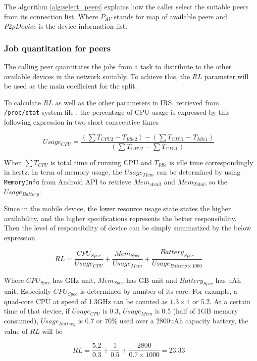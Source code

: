 \documentclass[conference]{IEEEtran}
\begin{document}
The algorithm \ref{alg:select_peers} explains how the caller select the suitable peers from its connection list. Where $P_{AV}$ stands for map of available peers and $P2pDevice$ is the device information list.\\

\subsubsection{Job quantitation for peers}\label{ss_jqfp}

The calling peer quantitates the jobs from a task to distribute to the other available devices in the network suitably. To achieve this, the $RL$ parameter will be used as the main coefficient for the split. 
 
To calculate $RL$ as well as the other parameters in IRS, retrieved from \texttt{/proc/stat} system file \cite{stat_explain}, the percentage of CPU usage is expressed by this following expression in two short consecutive times

$$Usage_{CPU} = \frac{(\sum{T_{CPU2}} - T_{Idle2}) - (\sum{T_{CPU1}} - T_{Idle1})}{(\sum{T_{CPU2}} - \sum{T_{CPU1}})}$$

When $\sum{T_{CPU}}$ is total time of running CPU and $T_{Idle}$ is idle time correspondingly in hertz. In term of memory usage, the $Usage_{Mem}$ can be determined by using \texttt{MemoryInfo} from Android API to retrieve $Mem_{Avail}$ and $Mem_{Total}$, so the $Usage_{Battery}$.

Since in the mobile device, the lower resource usage state states the higher availability, and the higher specifications represents the better responsibility. Then the level of responsibility of device can be simply summarized by the below expression

$$RL = \frac{CPU_{Spec}}{Usage_{CPU}} + \frac{Mem_{Spec}}{Usage_{Mem}} + \frac{Battery_{Spec}}{Usage_{Battery \times 1000}}$$

Where $CPU_{Spec}$ has GHz unit, $Mem_{Spec}$ has GB unit and $Battery_{Spec}$ has uAh unit. Especially $CPU_{Spec}$ is determined by number of its core. For example, a quad-core CPU at speed of 1.3GHz can be counted as $1.3 \times 4$ or 5.2. At a certain time of that device, if $Usage_{CPU}$ is 0.3, $Usage_{Mem}$ is 0.5 (half of 1GB memory consumed), $Usage_{Battery}$ is 0.7 or 70\% used over a 2800uAh capacity battery, the value of $RL$ will be

$$RL = \frac{5.2}{0.3} + \frac{1}{0.5} + \frac{2800}{0.7 \times 1000} = 23.33$$
\end{document}
